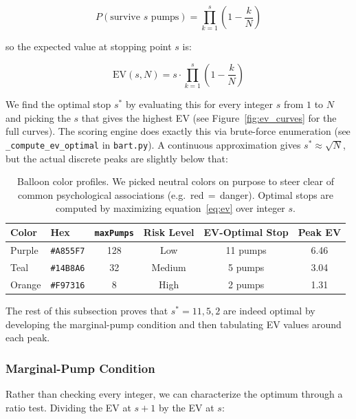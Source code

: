 \documentclass[11pt,a4paper]{article}
\begin{document}
\begin{equation}
P(\text{survive } s \text{ pumps}) = \prod_{k=1}^{s}\left(1 - \frac{k}{N}\right)
\end{equation}

so the expected value at stopping point $s$ is:

\begin{equation}
\label{eq:ev}
\text{EV}(s, N) = s \cdot \prod_{k=1}^{s}\left(1 - \frac{k}{N}\right)
\end{equation}

We find the optimal stop $s^*$ by evaluating this for every integer $s$ from
$1$ to $N$ and picking the $s$ that gives the highest EV (see
Figure~\ref{fig:ev_curves} for the full curves). The scoring engine
does exactly this via brute-force enumeration (see \texttt{\_compute\_ev\_optimal}
in \texttt{bart.py}). A continuous approximation gives $s^* \approx \sqrt{N}$,
but the actual discrete peaks are slightly below that:

\begin{table}[H]
\centering
\begin{tabular}{@{}llcccc@{}}
\toprule
\textbf{Color} & \textbf{Hex} & \textbf{\texttt{maxPumps}} & \textbf{Risk Level} & \textbf{EV-Optimal Stop} & \textbf{Peak EV} \\
\midrule
\textcolor{purpleballoon}{Purple} & \texttt{\#A855F7} & 128 & Low    & 11 pumps & 6.46 \\
\textcolor{tealballoon}{Teal}     & \texttt{\#14B8A6} & 32  & Medium & 5 pumps  & 3.04 \\
\textcolor{orangeballoon}{Orange} & \texttt{\#F97316} & 8   & High   & 2 pumps  & 1.31 \\
\bottomrule
\end{tabular}
\caption{Balloon color profiles. We picked neutral colors on purpose to
steer clear of common psychological associations (e.g.\ red\,$=$\,danger).
Optimal stops are computed by maximizing equation~\eqref{eq:ev} over integer $s$.}
\end{table}

The rest of this subsection proves that $s^* = 11, 5, 2$ are indeed optimal by
developing the marginal-pump condition and then tabulating EV values around
each peak.

\subsubsection*{Marginal-Pump Condition}

Rather than checking every integer, we can characterize the optimum through a
ratio test. Dividing the EV at $s+1$ by the EV at $s$:
\end{document}
